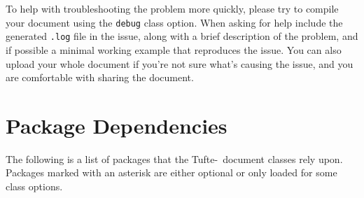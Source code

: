 \documentclass[a4paper]{tufte-handout}
\newcommand{\TL}{Tufte-\hologo{LaTeX}\xspace}
\newcommand{\hlorange}[1]{\textcolor{tufte-orange}{#1}}
\newcommand{\docclsopt}[1]{\hlorange{\texttt{#1}}}
\begin{document}
To help with troubleshooting the problem more quickly, please try to compile your document using the \docclsopt{debug} class option.
When asking for help include the generated \texttt{.log} file in the issue, along with a brief description of the problem, and if possible a minimal working example that reproduces the issue.
You can also upload your whole document if you're not sure what's causing the issue, and you are comfortable with sharing the document.


\section{Package Dependencies}\label{sec:dependencies}
The following is a list of packages that the \TL\ document classes rely upon. 
Packages marked with an asterisk are either optional or only loaded for some class options.
\end{document}
